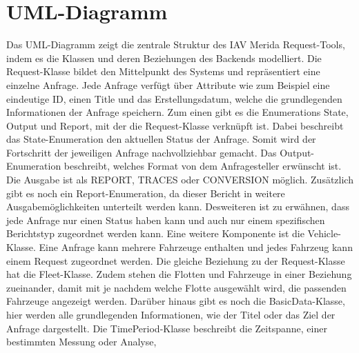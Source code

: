 \section{UML-Diagramm}
Das UML-Diagramm zeigt die zentrale Struktur des IAV Merida Request-Tools, indem es die Klassen und deren Beziehungen des Backends modelliert. Die \grqq Request\grqq{}-Klasse bildet den Mittelpunkt des Systems und repräsentiert eine einzelne Anfrage. Jede Anfrage verfügt über Attribute wie zum Beispiel eine eindeutige ID, einen Title und das Erstellungsdatum, welche die grundlegenden Informationen der Anfrage speichern.
\newline
Zum einen gibt es die Enumerations \grqq State\grqq{}, \grqq Output\grqq{} und \grqq Report\grqq{}, mit der die \grqq Request\grqq{}-Klasse verknüpft ist. Dabei beschreibt das \grqq State\grqq{}-Enumeration den aktuellen Status der Anfrage. Somit wird der Fortschritt der jeweiligen Anfrage nachvollziehbar gemacht. Das \grqq Output\grqq{}-Enumeration beschreibt, welches Format von dem Anfragesteller erwünscht ist. Die Ausgabe ist als \grqq REPORT\grqq{}, \grqq TRACES\grqq{} oder \grqq CONVERSION\grqq{} möglich. Zusätzlich gibt es noch ein \grqq Report\grqq{}-Enumeration, da dieser Bericht in weitere Ausgabemöglichkeiten unterteilt werden kann. Desweiteren ist zu erwähnen, dass jede Anfrage nur einen Status haben kann und auch nur einem spezifischen Berichtstyp zugeordnet werden kann. 
\newline
Eine weitere Komponente ist die \grqq Vehicle\grqq{}-Klasse. Eine Anfrage kann mehrere Fahrzeuge enthalten und jedes Fahrzeug kann einem Request zugeordnet werden. Die gleiche Beziehung zu der \grqq Request\grqq{}-Klasse hat die \grqq Fleet\grqq{}-Klasse. Zudem stehen die Flotten und Fahrzeuge in einer Beziehung zueinander, damit mit je nachdem welche Flotte ausgewählt wird, die passenden Fahrzeuge angezeigt werden.
\newline
Darüber hinaus gibt es noch die \grqq BasicData\grqq{}-Klasse, hier werden alle grundlegenden Informationen, wie der Titel oder das Ziel der Anfrage dargestellt. Die \grqq TimePeriod\grqq{}-Klasse beschreibt die Zeitspanne, einer bestimmten Messung oder Analyse,
\label{chap:kapitel5}